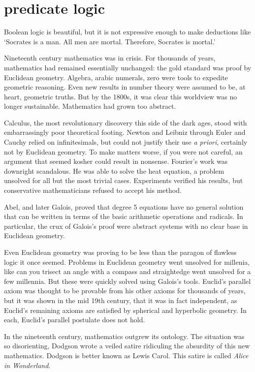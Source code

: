 \documentclass{scrbook}
\begin{document}
\chapter[Predicate Logic]{predicate logic}
Boolean logic is beautiful, but it is not expressive enough to make deductions like `Socrates is a man. All men are mortal. Therefore, Socrates is mortal.' 

Nineteenth century mathematics was in crisis. For thousands of years, mathematics had remained essentially unchanged: the gold standard was proof by Euclidean geometry. Algebra, arabic numerals, zero were tools to expedite geometric reasoning. Even new results in number theory were assumed to be, at heart, geometric truths. But by the 1800s, it was clear this worldview was no longer sustainable. Mathematics had grown too abstract.

Calculus, the most revolutionary discovery this side of the dark ages, stood with embarrassingly poor theoretical footing. Newton and Leibniz through Euler and Cauchy relied on infinitesimals, but could not justify their use \emph{a priori}, certainly not by Euclidean geometry. To make matters worse, if you were not careful, an argument that seemed kosher could result in nonsense. 
Fourier's work was downright scandalous. He was able to solve the heat equation, a problem unsolved for all but the most trivial cases. Experiments verified his results, but conservative mathematicians refused to accept his method.

Abel, and later Galois, proved that degree 5 equations have no general solution that can be written in terms of the basic arithmetic operations and radicals. In particular, the crux of Galois's proof were abstract systems with no clear base in Euclidean geometry. 

Even Euclidean geometry was proving to be less than the paragon of flawless logic it once seemed. Problems in Euclidean geometry went unsolved for millenia, like can you trisect an angle with a compass and straightedge went unsolved for a few millennia. But these were quickly solved using Galois's tools.\cite{wiki:trisect} Euclid's parallel axiom was thought to be provable from his other axioms for thousands of years, but it was shown in the mid 19th century, that it was in fact independent, as Euclid's remaining axioms are satisfied by spherical and hyperbolic geometry. In each, Euclid's parallel postulate does not hold. 

In the nineteenth century, mathematics outgrew its ontology. The situation was so disorienting, Dodgson wrote a veiled satire ridiculing the absurdity of this new mathematics. Dodgson is better known as Lewis Carol. This satire is called \emph{Alice in Wonderland}.\cite{alice}
\end{document}
